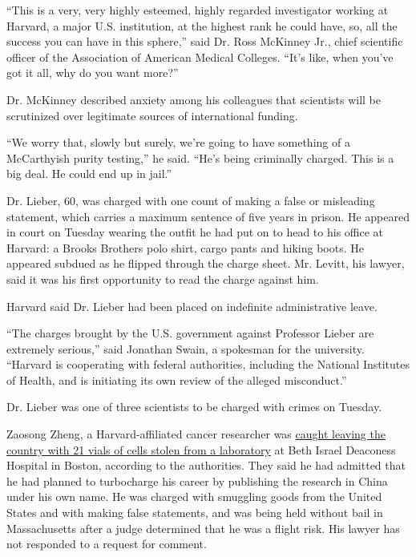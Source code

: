 ``This is a very, very highly esteemed, highly regarded investigator
working at Harvard, a major U.S. institution, at the highest rank he
could have, so, all the success you can have in this sphere,'' said Dr.
Ross McKinney Jr., chief scientific officer of the Association of
American Medical Colleges. ``It's like, when you've got it all, why do
you want more?''

Dr. McKinney described anxiety among his colleagues that scientists will
be scrutinized over legitimate sources of international funding.

``We worry that, slowly but surely, we're going to have something of a
McCarthyish purity testing,'' he said. ``He's being criminally charged.
This is a big deal. He could end up in jail.''

Dr. Lieber, 60, was charged with one count of making a false or
misleading statement, which carries a maximum sentence of five years in
prison. He appeared in court on Tuesday wearing the outfit he had put on
to head to his office at Harvard: a Brooks Brothers polo shirt, cargo
pants and hiking boots. He appeared subdued as he flipped through the
charge sheet. Mr. Levitt, his lawyer, said it was his first opportunity
to read the charge against him.

Harvard said Dr. Lieber had been placed on indefinite administrative
leave.

``The charges brought by the U.S. government against Professor Lieber
are extremely serious,'' said Jonathan Swain, a spokesman for the
university. ``Harvard is cooperating with federal authorities, including
the National Institutes of Health, and is initiating its own review of
the alleged misconduct.''

Dr. Lieber was one of three scientists to be charged with crimes on
Tuesday.

Zaosong Zheng, a Harvard-affiliated cancer researcher was
\href{https://www.nytimes3xbfgragh.onion/2019/12/31/us/chinese-scientist-cancer-research-investigation.html}{caught
leaving the country with 21 vials of cells stolen from a laboratory} at
Beth Israel Deaconess Hospital in Boston, according to the authorities.
They said he had admitted that he had planned to turbocharge his career
by publishing the research in China under his own name. He was charged
with smuggling goods from the United States and with making false
statements, and was being held without bail in Massachusetts after a
judge determined that he was a flight risk. His lawyer has not responded
to a request for comment.


